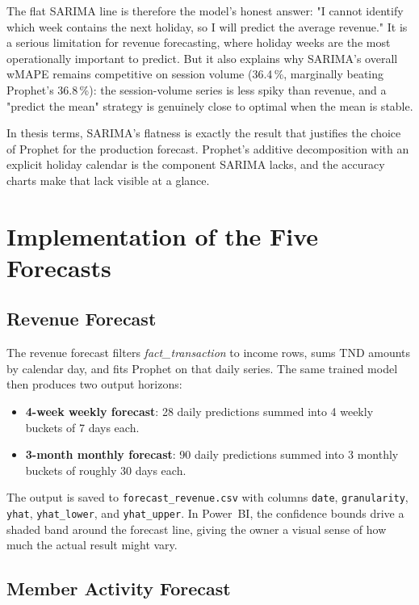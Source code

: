 The flat SARIMA line is therefore the model's honest answer: "I cannot identify which
week contains the next holiday, so I will predict the average revenue." It is a
serious limitation for revenue forecasting, where holiday weeks are the most
operationally important to predict. But it also explains why SARIMA's overall wMAPE
remains competitive on session volume (36.4\,\%, marginally beating Prophet's
36.8\,\%): the session-volume series is less spiky than revenue, and a "predict the
mean" strategy is genuinely close to optimal when the mean is stable.

In thesis terms, SARIMA's flatness is exactly the result that justifies the choice
of Prophet for the production forecast. Prophet's additive decomposition with an
explicit holiday calendar is the component SARIMA lacks, and the accuracy charts
make that lack visible at a glance.

\section{Implementation of the Five Forecasts}

\subsection{Revenue Forecast}\label{sub:revenue_forecast}

The revenue forecast filters \textit{fact\_transaction} to income rows, sums TND
amounts by calendar day, and fits Prophet on that daily series. The same trained model
then produces two output horizons:

\begin{itemize}[noitemsep]
  \item \textbf{4-week weekly forecast}: 28 daily predictions summed into 4 weekly
        buckets of 7 days each.
  \item \textbf{3-month monthly forecast}: 90 daily predictions summed into 3 monthly
        buckets of roughly 30 days each.
\end{itemize}

The output is saved to \texttt{forecast\_revenue.csv} with columns \texttt{date},
\texttt{granularity}, \texttt{yhat}, \texttt{yhat\_lower}, and \texttt{yhat\_upper}.
In Power~BI, the confidence bounds drive a shaded band around the forecast line,
giving the owner a visual sense of how much the actual result might vary.

\subsection{Member Activity Forecast}\label{sub:member_activity_forecast}

